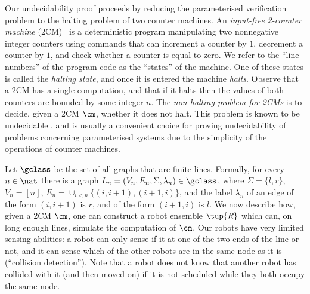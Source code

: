 


Our undecidability proof proceeds by reducing the parameterised verification problem to the halting problem of two counter machines. An \emph{input-free 2-counter machine} (2CM)~\cite{Minsky67} is a deterministic program manipulating two nonnegative integer counters using commands that can increment a counter by $1$, decrement a counter by $1$, and check whether a counter is equal to zero. We refer to the ``line numbers'' of the program code as the ``states'' of the machine. One of these states is called the \emph{halting state}, and once it is entered the machine \emph{halts}. Observe that a 2CM has a single computation, and that if it halts then the values of both counters are bounded by some integer $n$.
%
The \emph{non-halting problem for 2CMs} is to decide, given a 2CM $\cm$, whether it does not halt. This problem is known to be undecidable \cite{Minsky67}, and is usually a convenient choice for proving undecidability of problems concerning parameterised systems due to the simplicity of the operations of counter machines.

Let $\gclass$ be the set of all graphs that are finite lines. Formally, for every $n \in \nat$ there is a graph $L_n = (V_n,E_n,\Sigma,\lambda_n) \in \gclass$, where $\Sigma = \{l,r\}$, $V_n = [n]$, $E_n = \cup_{i < n} \{(i,i+1), (i+1,i)\}$, and the label $\lambda_n$ of an edge of the form $(i,i+1)$ is $r$, and of the form $(i+1,i)$ is $l$. We now describe how, given a 2CM $\cm$, one can construct a robot ensemble $\tup{R}$ which can, on long enough lines, simulate the computation of $\cm$.
Our robots have very limited sensing abilities: a robot can only sense if it at one of the two ends of the line or not, and it can sense which of the other robots are in the same node as it is (``collision detection''). Note that a robot does not know that another robot has collided with it (and then moved on) if it is not scheduled while they both occupy the same node.

